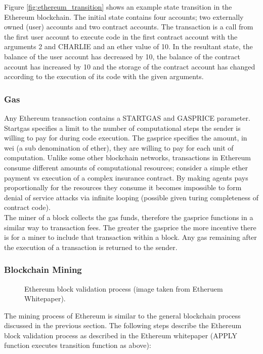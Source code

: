 Figure \ref{fig:ethereum_transition} shows an example state transition in the Ethereum blockchain. The initial state contains four accounts; two externally owned (user) accounts and two contract accounts. The transaction is a call from the first user account to execute code in the first contract account with the arguments 2 and CHARLIE and an ether value of 10. In the resultant state, the balance of the user account has decreased by 10, the balance of the contract account has increased by 10 and the storage of the contract account has changed according to the execution of its code with the given arguments.\\

\subsubsection{Gas}
Any Ethereum transaction contains a STARTGAS and GASPRICE parameter. Startgas specifies a limit to the number of computational steps the sender is willing to pay for during code execution. The gasprice specifies the amount, in wei (a sub denomination of ether), they are willing to pay for each unit of computation. Unlike some other blockchain networks, transactions in Ethereum consume different amounts of computational resources; consider a simple ether payment vs execution of a complex insurance contract. By making agents pays proportionally for the resources they consume it becomes impossible to form denial of service attacks via infinite looping (possible given turing completeness of contract code). \\

The miner of a block collects the gas funds, therefore the gasprice functions in a similar way to transaction fees. The greater the gasprice the more incentive there is for a miner to include that transaction within a block. Any gas remaining after the execution of a transaction is returned to the sender.\\ 

\subsubsection{Blockchain Mining}
\begin{figure}
\centering
{}
\decoRule
\caption[Ethereum Block Validation Process]{Ethereum block validation process (image taken from Etheruem Whitepaper\cite{Ethereum}).}
\label{fig:ethereum_state_transition}
\end{figure}
The mining process of Ethereum is similar to the general blockchain process discussed in the previous section. The following steps describe the Ethereum block validation process as described in the Ethereum whitepaper (APPLY function executes transition function as above):

